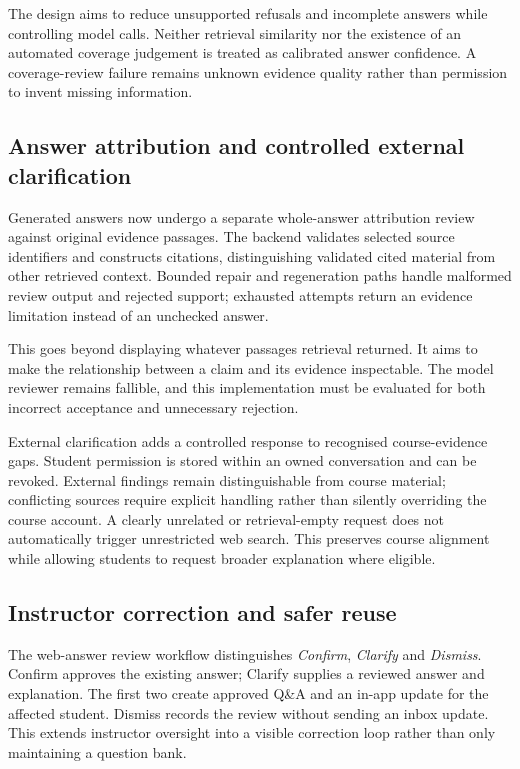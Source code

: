 \documentclass[11pt,a4paper]{article}
\begin{document}
The design aims to reduce unsupported refusals and incomplete answers while controlling model calls. Neither retrieval similarity nor the existence of an automated coverage judgement is treated as calibrated answer confidence. A coverage-review failure remains unknown evidence quality rather than permission to invent missing information.

\subsection{Answer attribution and controlled external clarification}
Generated answers now undergo a separate whole-answer attribution review against original evidence passages. The backend validates selected source identifiers and constructs citations, distinguishing validated cited material from other retrieved context. Bounded repair and regeneration paths handle malformed review output and rejected support; exhausted attempts return an evidence limitation instead of an unchecked answer.

This goes beyond displaying whatever passages retrieval returned. It aims to make the relationship between a claim and its evidence inspectable. The model reviewer remains fallible, and this implementation must be evaluated for both incorrect acceptance and unnecessary rejection.

External clarification adds a controlled response to recognised course-evidence gaps. Student permission is stored within an owned conversation and can be revoked. External findings remain distinguishable from course material; conflicting sources require explicit handling rather than silently overriding the course account. A clearly unrelated or retrieval-empty request does not automatically trigger unrestricted web search. This preserves course alignment while allowing students to request broader explanation where eligible.

\subsection{Instructor correction and safer reuse}
The web-answer review workflow distinguishes \emph{Confirm}, \emph{Clarify} and \emph{Dismiss}. Confirm approves the existing answer; Clarify supplies a reviewed answer and explanation. The first two create approved Q\&A and an in-app update for the affected student. Dismiss records the review without sending an inbox update. This extends instructor oversight into a visible correction loop rather than only maintaining a question bank.
\end{document}
